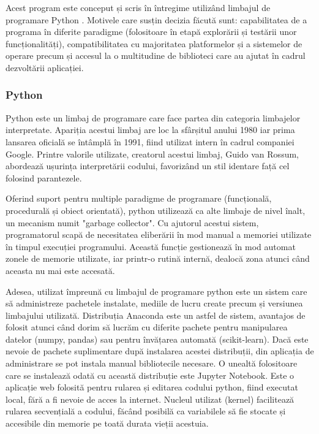 \documentclass[a4paper, 12pt]{report}
\begin{document}
	Acest program este conceput și scris în întregime utilizând limbajul de programare Python \cite{python}. Motivele care susțin decizia făcută sunt: capabilitatea de a programa în diferite paradigme (folositoare în etapă explorării și testării unor funcționalități), compatibilitatea cu majoritatea platformelor și a sistemelor de operare precum și accesul la o multitudine de biblioteci care au ajutat în cadrul dezvoltării aplicației.
	
	\clearpage
	\subsubsection{Python}
	Python este un limbaj de programare care face partea din categoria limbajelor interpretate. Apariția acestui limbaj are loc la sfârșitul anului 1980 iar prima lansarea oficială se întâmplă în 1991, fiind utilizat intern în cadrul companiei Google. Printre valorile utilizate, creatorul acestui limbaj, Guido van Rossum, abordează ușurința interpretării codului, favorizând un stil identare față cel folosind parantezele.

	Oferind suport pentru multiple paradigme de programare (funcțională, procedurală și obiect orientată), python utilizează ca alte limbaje de nivel înalt, un mecanism numit "garbage collector". Cu ajutorul acestui sistem, programatorul scapă de necesitatea eliberării în mod manual a memoriei utilizate în timpul execuției programului. Această funcție gestionează în mod automat zonele de memorie utilizate, iar printr-o rutină internă, dealocă zona atunci când aceasta nu mai este accesată. 

	Adesea, utilizat împreună cu limbajul de programare python este un sistem care să administreze pachetele instalate, mediile de lucru create precum și versiunea limbajului utilizată. Distribuția Anaconda \cite{anaconda} este un astfel de sistem, avantajos de folosit atunci când dorim să lucrăm cu diferite pachete pentru manipularea datelor (numpy, pandas) sau pentru învățarea automată (scikit-learn). Dacă este nevoie de pachete suplimentare după instalarea acestei distribuții, din aplicația de administrare se pot instala manual bibliotecile necesare. O unealtă folositoare care se instalează odată cu această distribuție este Jupyter Notebook. Este o aplicație web folosită pentru rularea și editarea codului python, fiind executat local, fără a fi nevoie de acces la internet. Nucleul utilizat (kernel) facilitează rularea secvențială a codului, făcând posibilă ca variabilele să fie stocate și accesibile din memorie pe toată durata vieții acestuia. 
	
\end{document}
